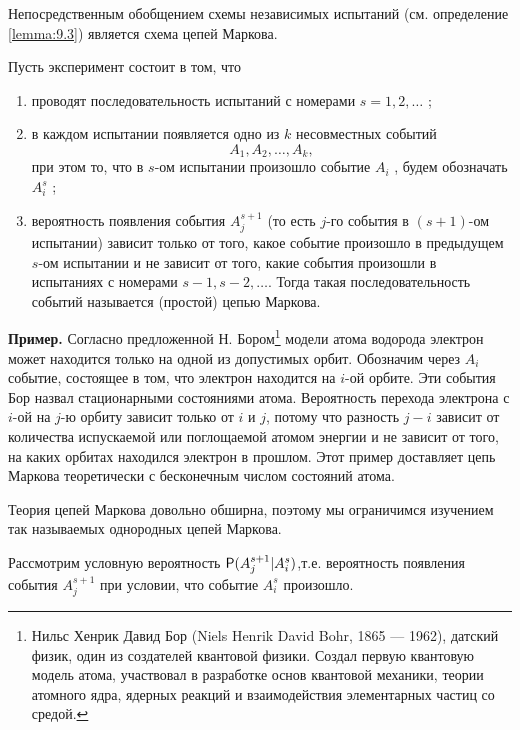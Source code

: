 
Непосредственным обобщением схемы независимых испытаний (см. определение 
\ref{lemma:9.3}) является схема цепей Маркова.

\begin{definition}
\label{def:28.1}
Пусть эксперимент состоит в том, что
\begin{enumerate}
	\item проводят последовательность испытаний с номерами $s = 1, 2, \ldots$ ;
	\item в каждом испытании появляется одно из $k$ несовместных событий
	$$A_1 , A_2 , \ldots , A_k,$$ при этом то, что в $s$-ом испытании произошло событие $A_i$ , будем обозначать $A^s_i$ ;
	\item вероятность появления события $A^{s+1}_j$ (то есть $j$-го события в $(s+1)$-ом испытании) зависит только от того, какое событие произошло в предыдущем $s$-ом испытании и не зависит от того, какие события произошли в испытаниях с номерами $s − 1, s − 2, \ldots $.
Тогда такая последовательность событий называется (простой) цепью Маркова.
\end{enumerate}

\end{definition}

\textbf{Пример.} Согласно предложенной Н. Бором\footnote{Нильс Хенрик Давид Бор (Niels Henrik David Bohr, 1865 — 1962), датский физик, один из создателей
квантовой физики. Создал первую квантовую модель атома, участвовал в разработке основ квантовой
механики, теории атомного ядра, ядерных реакций и взаимодействия элементарных частиц со средой.
} модели атома водорода электрон может находится только на одной из допустимых орбит. Обозначим через  $A_i$ событие, состоящее в том, что электрон находится на
$i$-ой орбите. Эти события Бор назвал стационарными состояниями атома. Вероятность перехода электрона с $i$-ой на $j$-ю орбиту зависит только от $i$ и $j$, потому что разность $j − i$ зависит от количества испускаемой
или поглощаемой атомом энергии и не зависит от того, на каких орбитах находился электрон в прошлом. Этот пример доставляет цепь Маркова теоретически с бесконечным числом состояний атома.

Теория цепей Маркова довольно обширна, поэтому мы ограничимся изучением так называемых однородных цепей Маркова.

Рассмотрим условную вероятность $\P(A^{s+1}_j|A^s_i)$,т.е. вероятность появления события $A_j^{s+1}$ при условии, что событие $A^s_i$ произошло.

